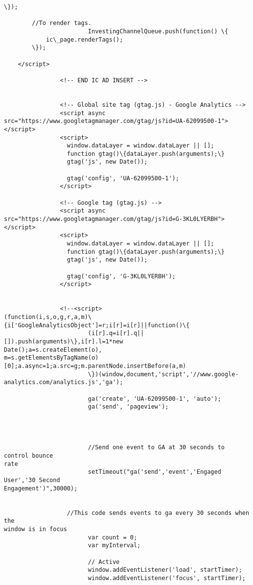 \documentclass[11pt]{article}
\begin{document}
\begin{Verbatim}[commandchars=\\\{\}]
        \});

        //To render tags.
                        InvestingChannelQueue.push(function() \{
            ic\_page.renderTags();
        \});

    </script>

                <!-- END IC AD INSERT -->


                <!-- Global site tag (gtag.js) - Google Analytics -->
                <script async
src="https://www.googletagmanager.com/gtag/js?id=UA-62099500-1"></script>
                <script>
                  window.dataLayer = window.dataLayer || [];
                  function gtag()\{dataLayer.push(arguments);\}
                  gtag('js', new Date());

                  gtag('config', 'UA-62099500-1');
                </script>

                <!-- Google tag (gtag.js) -->
                <script async
src="https://www.googletagmanager.com/gtag/js?id=G-3KL0LYERBH"></script>
                <script>
                  window.dataLayer = window.dataLayer || [];
                  function gtag()\{dataLayer.push(arguments);\}
                  gtag('js', new Date());

                  gtag('config', 'G-3KL0LYERBH');
                </script>


                <!--<script>
(function(i,s,o,g,r,a,m)\{i['GoogleAnalyticsObject']=r;i[r]=i[r]||function()\{
                        (i[r].q=i[r].q||[]).push(arguments)\},i[r].l=1*new
Date();a=s.createElement(o),
m=s.getElementsByTagName(o)[0];a.async=1;a.src=g;m.parentNode.insertBefore(a,m)
                        \})(window,document,'script','//www.google-
analytics.com/analytics.js','ga');

                        ga('create', 'UA-62099500-1', 'auto');
                        ga('send', 'pageview');




                        //Send one event to GA at 30 seconds to control bounce
rate
                        setTimeout("ga('send','event','Engaged User','30 Second
Engagement')",30000);


                  //This code sends events to ga every 30 seconds when the
window is in focus
                        var count = 0;
                        var myInterval;

                        // Active
                        window.addEventListener('load', startTimer);
                        window.addEventListener('focus', startTimer);


\end{Verbatim}
\end{document}

